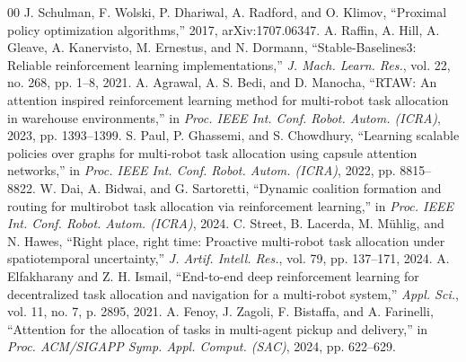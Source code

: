 \documentclass[conference]{IEEEtran}
\begin{document}
\begin{thebibliography}{00}
 J. Schulman, F. Wolski, P. Dhariwal, A. Radford, and O. Klimov, ``Proximal policy optimization algorithms,'' 2017, arXiv:1707.06347.
 A. Raffin, A. Hill, A. Gleave, A. Kanervisto, M. Ernestus, and N. Dormann, ``Stable-Baselines3: Reliable reinforcement learning implementations,'' \textit{J. Mach. Learn. Res.}, vol. 22, no. 268, pp. 1--8, 2021.
 A. Agrawal, A. S. Bedi, and D. Manocha, ``RTAW: An attention inspired reinforcement learning method for multi-robot task allocation in warehouse environments,'' in \textit{Proc. IEEE Int. Conf. Robot. Autom. (ICRA)}, 2023, pp. 1393--1399.
 S. Paul, P. Ghassemi, and S. Chowdhury, ``Learning scalable policies over graphs for multi-robot task allocation using capsule attention networks,'' in \textit{Proc. IEEE Int. Conf. Robot. Autom. (ICRA)}, 2022, pp. 8815--8822.
 W. Dai, A. Bidwai, and G. Sartoretti, ``Dynamic coalition formation and routing for multirobot task allocation via reinforcement learning,'' in \textit{Proc. IEEE Int. Conf. Robot. Autom. (ICRA)}, 2024.
 C. Street, B. Lacerda, M. Mühlig, and N. Hawes, ``Right place, right time: Proactive multi-robot task allocation under spatiotemporal uncertainty,'' \textit{J. Artif. Intell. Res.}, vol. 79, pp. 137--171, 2024.
 A. Elfakharany and Z. H. Ismail, ``End-to-end deep reinforcement learning for decentralized task allocation and navigation for a multi-robot system,'' \textit{Appl. Sci.}, vol. 11, no. 7, p. 2895, 2021.
 A. Fenoy, J. Zagoli, F. Bistaffa, and A. Farinelli, ``Attention for the allocation of tasks in multi-agent pickup and delivery,'' in \textit{Proc. ACM/SIGAPP Symp. Appl. Comput. (SAC)}, 2024, pp. 622--629.
\end{thebibliography}
\end{document}
